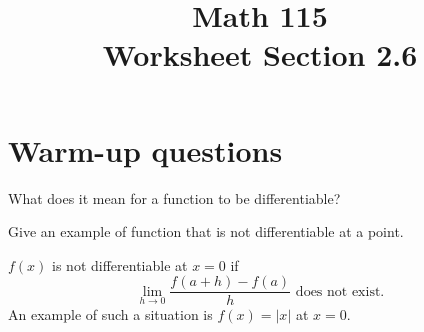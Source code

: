 \documentclass[11pt]{exam}
\title{\vspace{-0.5in} Math 115 \\ Worksheet Section 2.6}
\date{}
\begin{document}
\maketitle
\vspace{-0.75in}
\section*{Warm-up questions}

\noindent
What does it mean for a function to be differentiable?

\noindent
Give an example of function that is not differentiable at a point.
\begin{solution}
  \(f(x)\) is not differentiable at \(x=0\) if \[
    \lim_{h \to 0} \frac{f(a+h)-f(a)}{h} \text{ does not exist.}
  \]
  An example of such a situation is \(f(x)=|x|\) at \(x=0\).
\end{solution}
\end{document}
